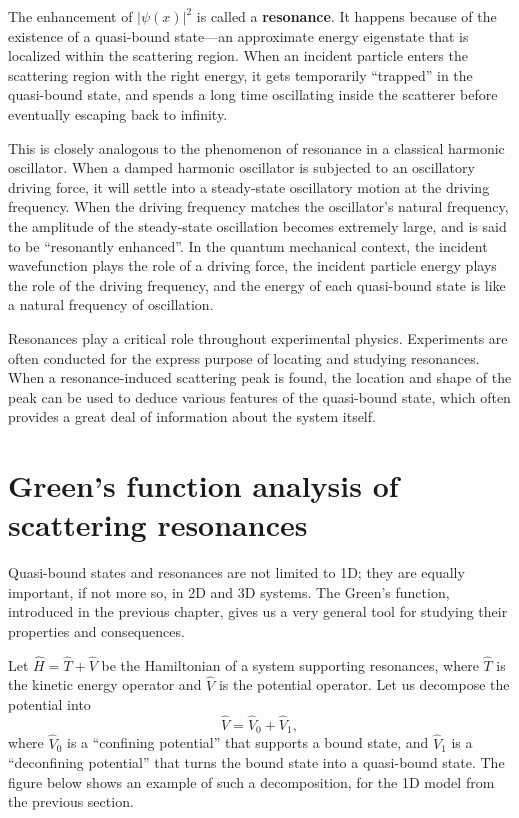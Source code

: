 \documentclass[pra,12pt]{revtex4}
\begin{document}
The enhancement of $|\psi(x)|^2$ is called a \textbf{resonance}.  It
happens because of the existence of a quasi-bound state---an
approximate energy eigenstate that is localized within the scattering
region.  When an incident particle enters the scattering region with
the right energy, it gets temporarily ``trapped'' in the quasi-bound
state, and spends a long time oscillating inside the scatterer before
eventually escaping back to infinity.

This is closely analogous to the phenomenon of resonance in a
classical harmonic oscillator.  When a damped harmonic oscillator is
subjected to an oscillatory driving force, it will settle into a
steady-state oscillatory motion at the driving frequency.  When the
driving frequency matches the oscillator's natural frequency, the
amplitude of the steady-state oscillation becomes extremely large, and
is said to be ``resonantly enhanced''.  In the quantum mechanical
context, the incident wavefunction plays the role of a driving force,
the incident particle energy plays the role of the driving frequency,
and the energy of each quasi-bound state is like a natural frequency
of oscillation.

Resonances play a critical role throughout experimental physics.
Experiments are often conducted for the express purpose of locating
and studying resonances.  When a resonance-induced scattering peak is
found, the location and shape of the peak can be used to deduce
various features of the quasi-bound state, which often provides a
great deal of information about the system itself.

\section{Green's function analysis of scattering resonances}
\label{sec:green_resonances}

Quasi-bound states and resonances are not limited to 1D; they are
equally important, if not more so, in 2D and 3D systems.  The Green's
function, introduced in the previous chapter, gives us a very general
tool for studying their properties and consequences.

Let $\hat{H} = \hat{T} + \hat{V}$ be the Hamiltonian of a system
supporting resonances, where $\hat{T}$ is the kinetic energy operator
and $\hat{V}$ is the potential operator.  Let us decompose the
potential into
\begin{equation}
  \hat{V} = \hat{V}_0 + \hat{V}_1,
\end{equation}
where $\hat{V}_0$ is a ``confining potential'' that supports a bound
state, and $\hat{V}_1$ is a ``deconfining potential'' that turns the
bound state into a quasi-bound state.  The figure below shows an
example of such a decomposition, for the 1D model from the previous
section.
\end{document}
